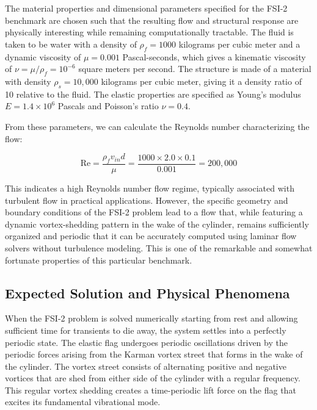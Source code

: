 ﻿\documentclass[a4paper,11pt]{article}
\theoremstyle{definition}
\begin{document}
The material properties and dimensional parameters specified for the FSI-2 benchmark are chosen such that the resulting flow and structural response are physically interesting while remaining computationally tractable. The fluid is taken to be water with a density of $\rho_f = 1000$ kilograms per cubic meter and a dynamic viscosity of $\mu = 0.001$ Pascal-seconds, which gives a kinematic viscosity of $\nu = \mu/\rho_f = 10^{-6}$ square meters per second. The structure is made of a material with density $\rho_s = 10,000$ kilograms per cubic meter, giving it a density ratio of 10 relative to the fluid. The elastic properties are specified as Young's modulus $E = 1.4 \times 10^6$ Pascals and Poisson's ratio $\nu = 0.4$.

From these parameters, we can calculate the Reynolds number characterizing the flow:

\begin{equation}
\text{Re} = \frac{\rho_f v_{in} d}{\mu} = \frac{1000 \times 2.0 \times 0.1}{0.001} = 200,000
\end{equation}

This indicates a high Reynolds number flow regime, typically associated with turbulent flow in practical applications. However, the specific geometry and boundary conditions of the FSI-2 problem lead to a flow that, while featuring a dynamic vortex-shedding pattern in the wake of the cylinder, remains sufficiently organized and periodic that it can be accurately computed using laminar flow solvers without turbulence modeling. This is one of the remarkable and somewhat fortunate properties of this particular benchmark.

\subsection{Expected Solution and Physical Phenomena}

When the FSI-2 problem is solved numerically starting from rest and allowing sufficient time for transients to die away, the system settles into a perfectly periodic state. The elastic flag undergoes periodic oscillations driven by the periodic forces arising from the Karman vortex street that forms in the wake of the cylinder. The vortex street consists of alternating positive and negative vortices that are shed from either side of the cylinder with a regular frequency. This regular vortex shedding creates a time-periodic lift force on the flag that excites its fundamental vibrational mode.
\end{document}
